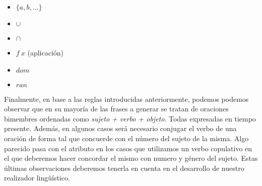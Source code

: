 \begin{itemize} [label={$\triangleright$}, leftmargin=*]
\begin{enumerate}
	\setlength{\itemsep}{7pt}
	\end{enumerate}
\item{$\{a, b, \ldots\}$}
	\begin{enumerate}	 
	\setlength{\itemsep}{7pt}
	\end{enumerate}
\item{$\cup$}
	\begin{enumerate}	 
	\setlength{\itemsep}{7pt}
	\end{enumerate}
\item{$\cap$}
	\begin{enumerate}	 
	\setlength{\itemsep}{7pt}
	\end{enumerate}
\item{$f~x$ (aplicación)}
	\begin{enumerate}	 
	\setlength{\itemsep}{7pt}
	\end{enumerate}
\item{$dom$}
	\begin{enumerate}	 
	\setlength{\itemsep}{7pt}
	\end{enumerate}
\item{$ran$}
	\begin{enumerate}	 
	\setlength{\itemsep}{7pt}
	\end{enumerate}
\end{itemize}  

Finalmente, en base a las reglas introducidas anteriormente, podemos podemos observar que en su mayoría de las frases a generar se tratan de oraciones bimembres ordenadas como \emph{sujeto + verbo + objeto}. Todas expresadas en tiempo presente. Además, en algunos casos será necesario conjugar el verbo de una oración de forma tal que concuerde con el número del sujeto de la misma. Algo parecido pasa con el atributo en los casos que utilizamos un verbo copulativo en el que deberemos hacer concordar el mismo con numero y género del sujeto. Estas últimas observaciones deberemos tenerla en cuenta en el desarrollo de nuestro realizador lingüístico.
